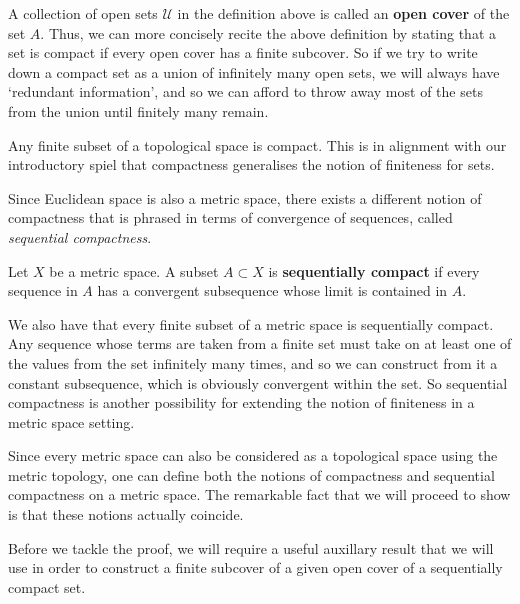  A collection of open sets \( \mathcal{U} \) in the definition above is called an \textbf{open cover} of the set \( A \). Thus, we can more concisely recite the above definition by stating that a set is compact if every open cover has a finite subcover. So if we try to write down a compact set as a union of infinitely many open sets, we will always have `redundant information', and so we can afford to throw away most of the sets from the union until finitely many remain.

 \vspace{3mm}

 Any finite subset of a topological space is compact. This is in alignment with our introductory spiel that compactness generalises the notion of finiteness for sets.

 \vspace{3mm}

 Since Euclidean space is also a metric space, there exists a different notion of compactness that is phrased in terms of convergence of sequences, called \emph{sequential compactness}.

 \begin{definition}
   Let \( X \) be a metric space. A subset \( A\subset X \) is \textbf{sequentially compact} if every sequence in \( A \) has a convergent subsequence whose limit is contained in \( A \).
 \end{definition}

 We also have that every finite subset of a metric space is sequentially compact. Any sequence whose terms are taken from a finite set must take on at least one of the values from the set infinitely many times, and so we can construct from it a constant subsequence, which is obviously convergent within the set. So sequential compactness is another possibility for extending the notion of finiteness in a metric space setting.

 \vspace{3mm}

 Since every metric space can also be considered as a topological space using the metric topology, one can define both the notions of compactness and sequential compactness on a metric space. The remarkable fact that we will proceed to show is that these notions actually coincide.

 \vspace{3mm}

 Before we tackle the proof, we will require a useful auxillary result that we will use in order to construct a finite subcover of a given open cover of a sequentially compact set.

